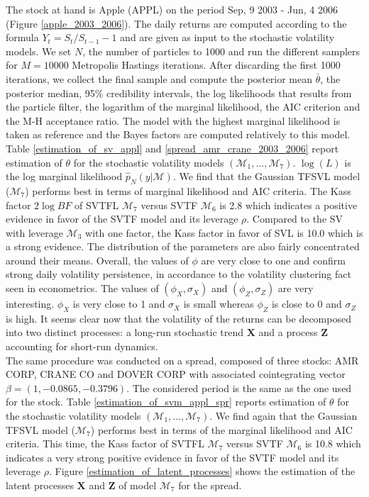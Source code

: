 \documentclass[11pt,a4,twosided,singlespacing,titlepagenumber=on]{scrreprt}
\numberwithin{equation}{chapter} %
\theoremstyle{remark}
\newcommand{\matr}[1]{\mathbf{#1}}
\begin{document}
The stock at hand is Apple (APPL) on the period Sep, 9 2003 - Jun, 4 2006 (Figure \ref{apple_2003_2006}). The daily returns are computed according to the formula $Y_t = S_t / S_{t-1} - 1$ and are given as input to the stochastic volatility models. We set $N$, the number of particles to 1000 and run the different samplers for $M = 10000$ Metropolis Hastings iterations. After discarding the first 1000 iterations, we collect the final sample and compute the posterior mean $\bar{\theta}$, the posterior median, 95\% credibility intervals, the log likelihoods that results from the particle filter, the logarithm of the marginal likelihood, the AIC criterion and the M-H acceptance ratio. The model with the highest marginal likelihood is taken as reference and the Bayes factors are computed relatively to this model. Table \ref{estimation_of_sv_appl} and \ref{spread_amr_crane_2003_2006} report estimation of $\theta$ for the stochastic volatility models $(\mathcal{M}_1, ..., \mathcal{M}_7)$. $\log (L)$ is the log marginal likelihood $\hat{p}_N(y| \mathcal{M})$. We find that the Gaussian TFSVL model ($\mathcal{M}_7$) performs best in terms of marginal likelihood and AIC criteria. The Kass factor $2 \log BF$ of SVTFL $\mathcal{M}_7$ versus SVTF $\mathcal{M}_6$ is 2.8 which indicates a positive evidence in favor of the SVTF model and its leverage $\rho$. Compared to the SV with leverage $\mathcal{M}_3$ with one factor, the Kass factor in favor of SVL is 10.0 which is a strong evidence. The distribution of the parameters are also fairly concentrated around their means. Overall, the values of $\phi$ are very close to one and confirm strong daily volatility persistence, in accordance to the volatility clustering fact seen in econometrics. The values of $(\phi_X, \sigma_X)$ and $(\phi_Z, \sigma_Z)$ are very interesting. $\phi_X$ is very close to 1 and $\sigma_X$ is small whereas $\phi_Z$ is close to 0 and $\sigma_Z$ is high. It seems clear now that the volatility of the returns can be decomposed into two distinct processes: a long-run stochastic trend $\matr{X}$ and a process $\matr{Z}$ accounting for short-run dynamics. \\

The same procedure was conducted on a spread, composed of three stocks: AMR CORP, CRANE CO and DOVER CORP with associated cointegrating vector $\beta = (1, -0.0865, -0.3796)$. The considered period is the same as the one used for the stock. Table \ref{estimation_of_svm_appl_spr} reports estimation of $\theta$ for the stochastic volatility models $(\mathcal{M}_1, ..., \mathcal{M}_7)$. We find again that the Gaussian TFSVL model ($\mathcal{M}_7$) performs best in terms of the marginal likelihood and AIC criteria. This time, the Kass factor of SVTFL $\mathcal{M}_7$ versus SVTF $\mathcal{M}_6$ is 10.8 which indicates a very strong positive evidence in favor of the SVTF model and its leverage $\rho$. Figure \ref{estimation_of_latent_processes} shows the estimation of the latent processes $\matr{X}$ and $\matr{Z}$ of model $\mathcal{M}_7$ for the spread. 
\end{document}
